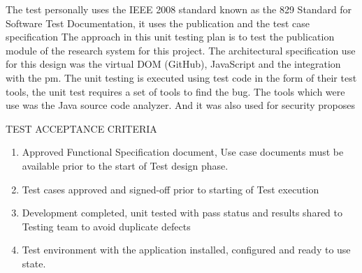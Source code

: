 The test personally uses the IEEE 2008 standard known as the 829 Standard for Software Test Documentation, it uses the publication and the test case specification The approach in this unit testing plan is to test the publication module of the research system for this project. The architectural specification use for this design was the virtual DOM (GitHub), JavaScript and the integration with the pm.
The unit testing is executed using test code in the form of their test tools, the unit test requires a set of tools to find the bug. The tools which were use was the Java source code analyzer. And it was also used for security proposes

TEST ACCEPTANCE CRITERIA
\begin{enumerate}
    \item Approved Functional Specification document, Use case documents must be available prior to the start of Test design phase.
    \item Test cases approved and signed-off prior to starting of Test execution
    \item Development completed, unit tested with pass status and results shared to Testing team to avoid duplicate defects
    \item Test environment with the application installed, configured and ready to use state.
\end{enumerate}
